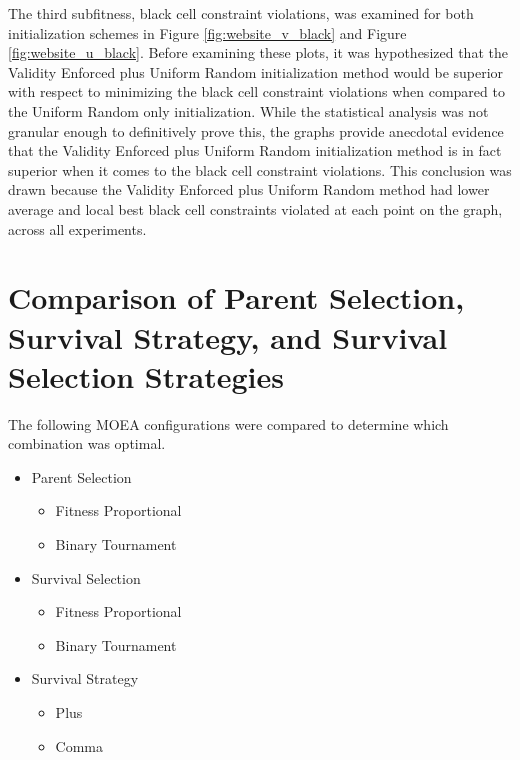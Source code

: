 \documentclass[11pt]{article}
\begin{document}
The third subfitness, black cell constraint violations, was examined for both initialization
schemes in Figure \ref{fig:website_v_black} and Figure \ref{fig:website_u_black}. Before examining
these plots, it was hypothesized that the Validity Enforced plus Uniform Random initialization 
method would be superior with respect to minimizing the black cell constraint violations when compared
to the Uniform Random only initialization. While the statistical analysis was not granular enough to
definitively prove this, the graphs provide anecdotal evidence that the Validity Enforced plus Uniform
Random initialization method is in fact superior when it comes to the black cell constraint violations.
This conclusion was drawn because the Validity Enforced plus Uniform Random method had lower average and
local best black cell constraints violated at each point on the graph, across all experiments.


\section{Comparison of Parent Selection, Survival Strategy, and Survival Selection Strategies}

The following MOEA configurations were compared to determine which combination was optimal.

\begin{itemize}

    \item Parent Selection
    \begin{itemize}
        \item Fitness Proportional
        \item Binary Tournament
    \end{itemize}

    \item Survival Selection
    \begin{itemize}
        \item Fitness Proportional
        \item Binary Tournament
    \end{itemize}

    \item Survival Strategy 
    \begin{itemize}
        \item Plus
        \item Comma
    \end{itemize}

\end{itemize}
\end{document}
